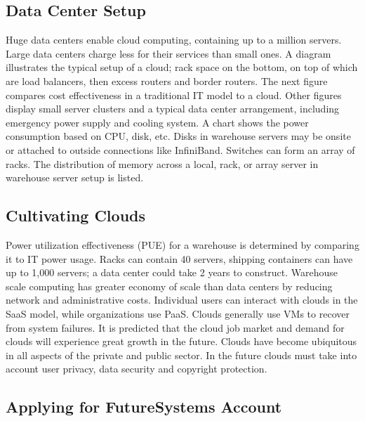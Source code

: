 
\subsection{Data Center Setup}

Huge data centers enable cloud computing, containing up to a million
servers. Large data centers charge less for their services than small
ones. A diagram illustrates the typical setup of a cloud; rack space on
the bottom, on top of which are load balancers, then excess routers and
border routers. The next figure compares cost effectiveness in a
traditional IT model to a cloud. Other figures display small server
clusters and a typical data center arrangement, including emergency
power supply and cooling system. A chart shows the power consumption
based on CPU, disk, etc. Disks in warehouse servers may be onsite or
attached to outside connections like InfiniBand. Switches can form an
array of racks. The distribution of memory across a local, rack, or
array server in warehouse server setup is listed.


\subsection{Cultivating Clouds}

Power utilization effectiveness (PUE) for a warehouse is determined by
comparing it to IT power usage. Racks can contain 40 servers, shipping
containers can have up to 1,000 servers; a data center could take 2
years to construct. Warehouse scale computing has greater economy of
scale than data centers by reducing network and administrative costs.
Individual users can interact with clouds in the SaaS model, while
organizations use PaaS. Clouds generally use VMs to recover from system
failures. It is predicted that the cloud job market and demand for
clouds will experience great growth in the future. Clouds have become
ubiquitous in all aspects of the private and public sector. In the
future clouds must take into account user privacy, data security and
copyright protection.


\subsection{Applying for FutureSystems Account}

